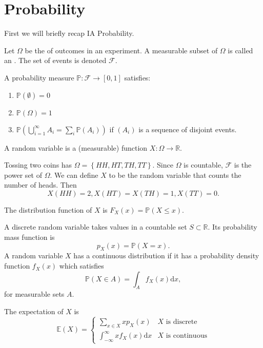 \documentclass[a4paper]{scrartcl}
\begin{document}
\section{Probability}
First we will briefly recap IA Probability.

Let $\Omega$ be the  of outcomes in an experiment. A measurable subset of $\Omega$ is called an . The set of events is denoted $\mathcal{F}$. 
\begin{definition}
     A probability measure $\mathbb{P}: \mathcal{F} \rightarrow [0,1]$ satisfies:
     \begin{enumerate}
         \item $\mathbb{P} (\emptyset)=0$ 
         \item $\mathbb{P}(\Omega)=1$
         \item $\mathbb{P}\left(\bigcup_{i=1}^{\infty} A_i= \sum_{i}^{}\mathbb{P} (A_i)\right)$ if $(A_i)$ is a sequence of disjoint events.   
     \end{enumerate} 
\end{definition}
\begin{definition}
     A random variable is a (measurable) function $X: \Omega \rightarrow \mathbb{R}$.
\end{definition}
\begin{example}
     Tossing two coins has $\Omega= \left\{HH,HT,TH,TT\right\}$. Since $\Omega$ is countable, $\mathcal{F}$ is the power set of $\Omega$. We can define $X$ to be the random variable that counts the number of heads. Then \[
     X (HH)=2, X (HT)=X (TH)=1, X (TT)=0
     .\] 
\end{example}
\begin{definition}
     The distribution function of $X$ is $F_X (x)=\mathbb{P} (X \leq x)$.
\end{definition}
A discrete random variable takes values in a countable set $S \subset \mathbb{R}$. Its probability mass function is \[
p_X (x)=\mathbb{P}(X=x)
.\] 
A random variable $X$ has a continuous distribution if it has a probability density function $f_X (x)$ which satisfies \[
\mathbb{P} (X \in A)=\int_A f_X (x) \mathrm{d}x
,\]
for measurable sets $A$. 

The expectation of $X$ is 
\begin{equation*}
     \mathbb{E} (X)=
     \begin{cases}
         \sum_{x \in X}^{}x p_X (x) & X \text{ is discrete} \\
         \int_{-\infty }^{\infty} x f_X (x)\mathrm{d}x & X \text{ is continuous}
     \end{cases}
\end{equation*}
\end{document}
